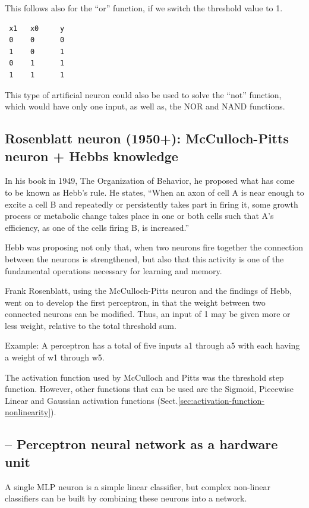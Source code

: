 This follows also for the “or” function, if we switch the threshold value to 1.  
 \begin{verbatim}
 x1   x0     y
 0    0      0
 1    0      1
 0    1      1
 1    1      1
 \end{verbatim}

This type of artificial neuron could also be used to solve the “not” function,
which would have only one input, as well as, the NOR and NAND functions.


\subsection{Rosenblatt neuron (1950+): McCulloch-Pitts neuron + Hebbs knowledge}

In his book in 1949, The Organization of Behavior, he proposed what has come to
be known as Hebb’s rule.  He states, “When an axon of cell A is near enough to
excite a cell B and repeatedly or persistently takes part in firing it, some
growth process or metabolic change takes place in one or both cells such that
A’s efficiency, as one of the cells firing B, is increased.”
 
Hebb was proposing not only that, when two neurons fire together the connection
between the neurons is strengthened, but also that this activity is one of the
fundamental operations necessary for learning and memory.

Frank Rosenblatt, using the McCulloch-Pitts neuron and the findings of Hebb,
went on to develop the first perceptron, in that the weight between two
connected neurons can be modified. Thus, an input of 1 may be given more or less
weight, relative to the total threshold sum.

Example: A perceptron has a total of five inputs a1 through a5 with each having
a weight of w1 through w5.

The activation function used by McCulloch and Pitts was the threshold step
function.  However, other functions that can be used are the Sigmoid, Piecewise
Linear and Gaussian activation functions (Sect.\ref{sec:activation-function-nonlinearity}).


\subsection{-- Perceptron neural network as a hardware unit}

A single MLP neuron is a simple linear classifier, but complex non-linear
classifiers can be built by combining these neurons into a network.


